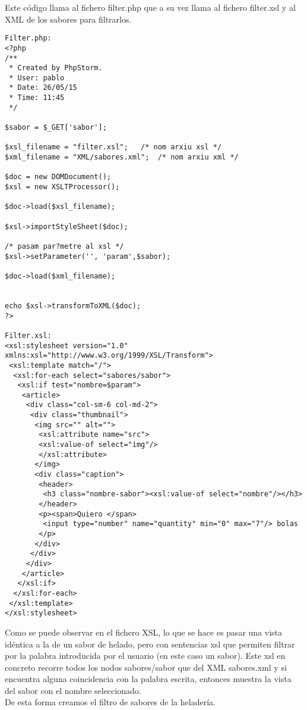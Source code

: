 \documentclass[11pt,a4paper]{article}
\begin{document}
Este código llama al fichero filter.php que a su vez llama al fichero filter.xsl y al XML de los sabores para filtrarlos.

\lstset{language=PHP}
\begin{lstlisting}
Filter.php:
<?php
/**
 * Created by PhpStorm.
 * User: pablo
 * Date: 26/05/15
 * Time: 11:45
 */

$sabor = $_GET['sabor'];

$xsl_filename = "filter.xsl";	/* nom arxiu xsl */
$xml_filename = "XML/sabores.xml";	/* nom arxiu xml */

$doc = new DOMDocument();
$xsl = new XSLTProcessor();

$doc->load($xsl_filename);

$xsl->importStyleSheet($doc);

/* pasam par?metre al xsl */
$xsl->setParameter('', 'param',$sabor);

$doc->load($xml_filename);


echo $xsl->transformToXML($doc);
?>

Filter.xsl:
<xsl:stylesheet version="1.0" xmlns:xsl="http://www.w3.org/1999/XSL/Transform">
 <xsl:template match="/">
  <xsl:for-each select="sabores/sabor">
   <xsl:if test="nombre=$param">
    <article>
     <div class="col-sm-6 col-md-2">
      <div class="thumbnail">
       <img src="" alt="">
        <xsl:attribute name="src">
        <xsl:value-of select="img"/>
        </xsl:attribute>
       </img>
       <div class="caption">
        <header>
         <h3 class="nombre-sabor"><xsl:value-of select="nombre"/></h3>
        </header>
        <p><span>Quiero </span>
         <input type="number" name="quantity" min="0" max="7"/> bolas
        </p>
       </div>
      </div>
     </div>
    </article>
   </xsl:if>
  </xsl:for-each>
 </xsl:template>
</xsl:stylesheet>

\end{lstlisting}

Como se puede observar en el fichero XSL, lo que se hace es pasar una vista idéntica a la de un sabor de helado, pero con sentencias xsl que permiten filtrar por la palabra introducida por el usuario (en este caso un sabor). Este xsl en concreto recorre todos los nodos sabores/sabor que del XML sabores.xml y si encuentra alguna coincidencia con la palabra escrita, entonces muestra la vista del sabor con el nombre seleccionado.\\
De esta forma creamos el filtro de sabores de la heladería.
\end{document}
